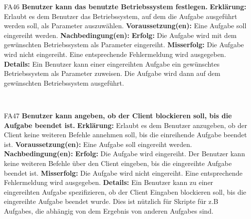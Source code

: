 \documentclass[a4paper,12pt]{article}
\begin{document}
\begin{itemize}[nosep]
	\begin{minipage}[t]{\linewidth}
		\item[FA46] \textbf{Benutzer kann das benutzte Betriebssystem festlegen.}
		\subitem \textbf{Erklärung:} Erlaubt es dem \gls{Benutzer} das Betriebssystem, auf dem die \gls{Aufgabe} ausgeführt werden soll, als \gls{Parameter} auszuwählen.
		\subitem \textbf{Voraussetzung(en):} Eine \gls{Aufgabe} soll eingereiht werden.
		\subitem \textbf{Nachbedingung(en):}
		\subsubitem \textbf{Erfolg:} Die \gls{Aufgabe} wird mit dem gewünschten Betriebssystem als \gls{Parameter} eingereiht.
		\subsubitem \textbf{Misserfolg:} Die \gls{Aufgabe} wird nicht eingereiht. Eine entsprechende Fehlermeldung wird ausgegeben.
		\subitem \textbf{Details:} Ein \gls{Benutzer} kann einer eingereihten \gls{Aufgabe} ein gewünschtes Betriebssystem als \gls{Parameter} zuweisen. Die \gls{Aufgabe} wird dann auf dem gewünschten Betriebssystem ausgeführt.
	\end{minipage}
	\newline
	\\
	
	\begin{minipage}[t]{\linewidth}
		\item[FA47] \textbf{Benutzer kann angeben, ob der \gls{Client} blockieren soll, bis die \gls{Aufgabe} beendet ist.}
		\subitem \textbf{Erklärung:} Erlaubt es dem \gls{Benutzer} anzugeben, ob der \gls{Client} keine weiteren Befehle annehmen soll, bis die einreihende \gls{Aufgabe} beendet ist.
		\subitem \textbf{Voraussetzung(en):} Eine \gls{Aufgabe} soll eingereiht werden.
		\subitem \textbf{Nachbedingung(en):}
		\subsubitem \textbf{Erfolg:} Die \gls{Aufgabe} wird eingereiht. Der \gls{Benutzer} kann keine weiteren Befehle über den \gls{Client} eingeben, bis die eingereihte \gls{Aufgabe} beendet ist.
		\subsubitem \textbf{Misserfolg:} Die \gls{Aufgabe} wird nicht eingereiht. Eine entsprechende Fehlermeldung wird ausgegeben.
		\subitem \textbf{Details:} Ein \gls{Benutzer} kann zu einer eingereihten \gls{Aufgabe} spezifizieren, ob der \gls{Client} Eingaben blockieren soll, bis die eingereihte \gls{Aufgabe} beendet wurde. Dies ist nützlich für Skripte für z.B \glspl{Aufgabe}, die abhängig von dem Ergebnis von anderen \glspl{Aufgabe} sind.
	\end{minipage}
	\newline
	\\
	

\end{itemize}
\end{document}

